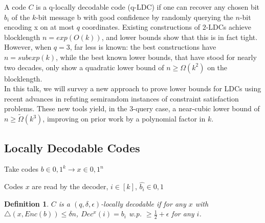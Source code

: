 \documentclass{article}
\newtheorem{definition}{Definition}
\begin{document}
A code $C$ is a q-locally decodable code (q-LDC) if one can recover any chosen bit $b_i$ of the $k$-bit message b with good confidence by randomly querying the $n$-bit encoding x on at most $q$ coordinates. Existing constructions of $2$-LDCs achieve blocklength $n = exp(O(k))$, and lower bounds show that this is in fact tight. However, when $q = 3$, far less is known: the best constructions have $n = subexp(k)$, while the best known lower bounds, that have stood for nearly two decades, only show a quadratic lower bound of $n \geq \Omega(k^2)$ on the blocklength.\\

\noindent In this talk, we will survey a new approach to prove lower bounds for LDCs using recent advances in refuting semirandom instances of constraint satisfaction problems. These new tools yield, in the $3$-query case, a near-cubic lower bound of $n \geq \tilde{\Omega}(k^3)$, improving on prior work by a polynomial factor in $k$.

\subsection{Locally Decodable Codes}

Take codes $b \in {0,1}^k \rightarrow x \in {0,1}^n$

\noindent Codes $x$ are read by the decoder, $i \in [k]$, $\hat{b_i} \in {0,1}$

\begin{definition}
$C$ is a $(q, \delta, \epsilon)$-locally decodable if for any $x$ with $\bigtriangleup(x, Enc(b)) \leq \delta n$, $Dec^x(i) = b_i$ w.p. $\geq \frac{1}{2} + \epsilon$ for any $i$.
\end{definition}

\newpage

\end{document}

